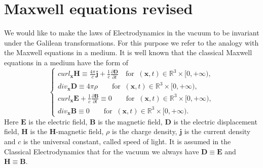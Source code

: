 \documentclass{article}
\theoremstyle{definition}
\theoremstyle{remark}
\renewcommand{\vec}[1]{\mathbf{#1}}
\newcommand{\R}{\mathbb{R}}
\newcommand{\R}{{\mathbb{R}}}
\begin{document}
\section{Maxwell equations revised}\label{MaxRevsPPN} We would like
to make the laws of Electrodynamics in the vacuum to be invariant
under the Galilean transformations. For this purpose we refer to the
analogy with the Maxwell equations in a medium. It is well known
that
the classical Maxwell equations in a medium have the form of
\begin{equation}\label{MaxVacPPN}
\begin{cases}
curl_{\vec x} \vec H\equiv \frac{4\pi}{c}\vec j+\frac{1}{c}\frac{\partial \vec D}{\partial t}\quad\text{for}\;\;({\vec x},t)\in\R^3\times[0,+\infty),\\
div_{\vec x} \vec D\equiv 4\pi\rho\quad\quad\text{for}\;\;({\vec x},t)\in\R^3\times[0,+\infty),\\
curl_{\vec x} \vec E+\frac{1}{c}\frac{\partial \vec B}{\partial t}\equiv 0\quad\quad\text{for}\;\;({\vec x},t)\in\R^3\times[0,+\infty),\\
div_{\vec x} \vec B\equiv 0\quad\quad\text{for}\;\;({\vec
x},t)\in\R^3\times[0,+\infty).
\end{cases}
\end{equation}
Here $\vec E$ is the electric field, $\vec B$ is the magnetic field,
$\vec D$ is the electric displacement field, $\vec H$ is the $\vec
H$-magnetic field, $\rho$ is the charge density, $\vec j$ is the
current density and $c$ is the universal constant,
called
speed of light.
%
%
%
It is assumed in the Classical Electrodynamics that for the vacuum
we always have $\vec D\equiv \vec E$ and $\vec H\equiv \vec B$.
\end{document}
